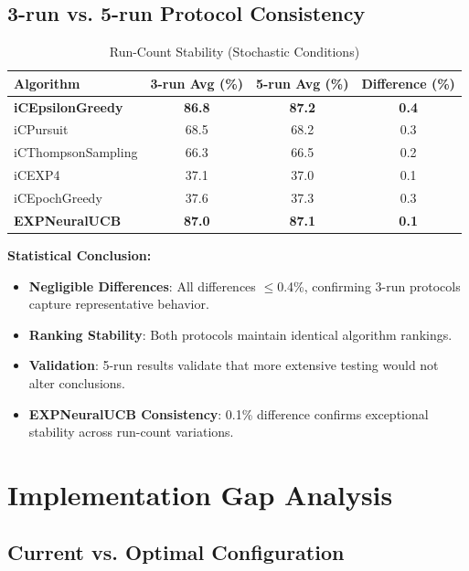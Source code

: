 \documentclass[12pt,a4paper]{article}
\newcommand{\success}[1]{\textcolor{accentgreen}{\textbf{#1}}}
\newcommand{\legacy}[1]{\textcolor{legacycolor}{\textbf{#1}}}
\begin{document}
\subsection{3-run vs. 5-run Protocol Consistency}

\begin{table}[H]
\centering
\caption{Run-Count Stability (Stochastic Conditions)}
\label{tab:run-count}
\begin{tabular}{@{}lccc@{}}
\toprule
\textbf{Algorithm} & \textbf{3-run Avg (\%)} & \textbf{5-run Avg (\%)} & \textbf{Difference (\%)} \\
\midrule
\success{iCEpsilonGreedy}   & \success{86.8} & \success{87.2} & \success{0.4} \\
iCPursuit                   & 68.5 & 68.2 & 0.3 \\
iCThompsonSampling          & 66.3 & 66.5 & 0.2 \\
iCEXP4                      & 37.1 & 37.0 & 0.1 \\
iCEpochGreedy               & 37.6 & 37.3 & 0.3 \\
\legacy{EXPNeuralUCB}       & \legacy{87.0} & \legacy{87.1} & \legacy{0.1} \\
\bottomrule
\end{tabular}
\end{table}

\textbf{Statistical Conclusion:}
\begin{itemize}
\item \success{Negligible Differences}: All differences $\leq$0.4\%, confirming 3-run protocols capture representative behavior.
\item \success{Ranking Stability}: Both protocols maintain identical algorithm rankings.
\item \success{Validation}: 5-run results validate that more extensive testing would not alter conclusions.
\item \legacy{EXPNeuralUCB Consistency}: 0.1\% difference confirms exceptional stability across run-count variations.
\end{itemize}

\section{Implementation Gap Analysis}

\subsection{Current vs. Optimal Configuration}
\end{document}
